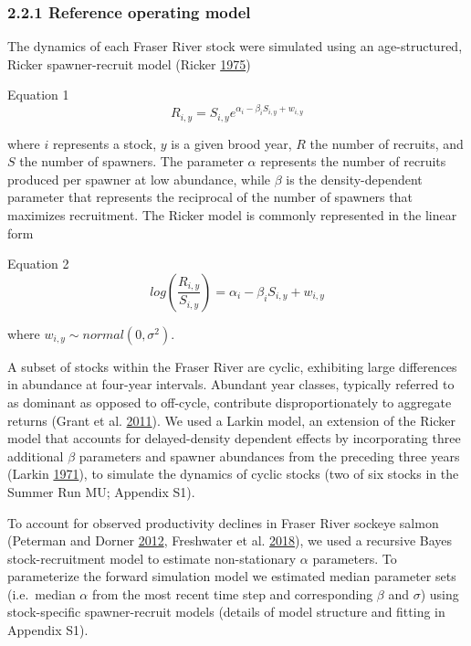 \documentclass[11pt]{book}
\begin{document}
\subsubsection{2.2.1 Reference operating model}\label{reference-operating-model}

The dynamics of each Fraser River stock were simulated using an age-structured, Ricker spawner-recruit model (Ricker \protect\hyperlink{ref-Ricker1975}{1975})

Equation 1 \[R_{i,y} = S_{i,y} e^{\alpha_i - \beta_iS_{i,y} + w_{i,y}}\]

where \(i\) represents a stock, \(y\) is a given brood year, \(R\) the number of recruits, and \(S\) the number of spawners. The parameter \(\alpha\) represents the number of recruits produced per spawner at low abundance, while \(\beta\) is the density-dependent parameter that represents the reciprocal of the number of spawners that maximizes recruitment. The Ricker model is commonly represented in the linear form

Equation 2 \[log(\frac{R_{i,y}}{S_{i,y}}) = \alpha_i - \beta_iS_{i,y} + w_{i,y}\]

where \(w_{i,y} \sim normal(0, \sigma^2)\).

A subset of stocks within the Fraser River are cyclic, exhibiting large differences in abundance at four-year intervals. Abundant year classes, typically referred to as dominant as opposed to off-cycle, contribute disproportionately to aggregate returns (Grant et al. \protect\hyperlink{ref-Grant2011}{2011}). We used a Larkin model, an extension of the Ricker model that accounts for delayed-density dependent effects by incorporating three additional \(\beta\) parameters and spawner abundances from the preceding three years (Larkin \protect\hyperlink{ref-Larkin1971}{1971}), to simulate the dynamics of cyclic stocks (two of six stocks in the Summer Run MU; Appendix S1).

To account for observed productivity declines in Fraser River sockeye salmon (Peterman and Dorner \protect\hyperlink{ref-Peterman2012}{2012}, Freshwater et al. \protect\hyperlink{ref-Freshwater2018}{2018}), we used a recursive Bayes stock-recruitment model to estimate non-stationary \(\alpha\) parameters. To parameterize the forward simulation model we estimated median parameter sets (i.e.~median \(\alpha\) from the most recent time step and corresponding \(\beta\) and \(\sigma\)) using stock-specific spawner-recruit models (details of model structure and fitting in Appendix S1).
\end{document}
